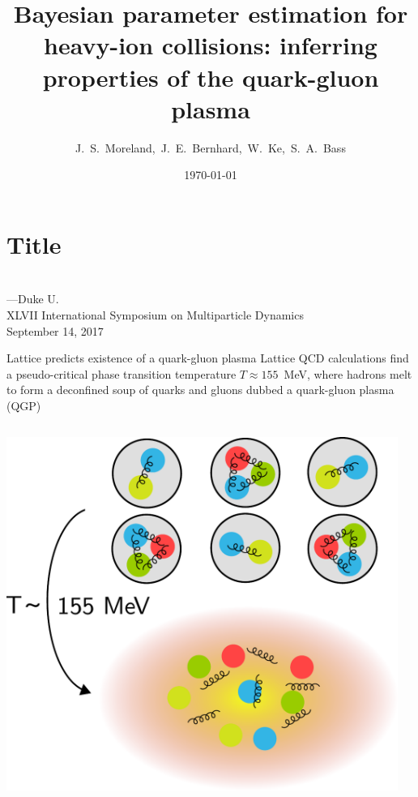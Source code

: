 \documentclass{beamer}
\title[Bayesian parameter estimation for HIC]{Bayesian parameter estimation for heavy-ion collisions: inferring properties of the quark-gluon plasma}
\author[J.\ S.\ Moreland]{J.\ S.\ Moreland,\, J.\ E.\ Bernhard,\, W.\ Ke,\, S.\ A.\ Bass}
\institute[Duke U.]{Duke Univerity}
\date{\today}
\begin{document}
\section{Title}


\begin{frame}
  \centering \vspace{.3\textheight}
  {\color{theme}\large\rm\inserttitle} \\[.04\textheight]
  {\small \insertauthor---Duke U.} \\[1ex]
  {\small XLVII International Symposium on Multiparticle Dynamics\\September 14, 2017}
\end{frame}


\begin{frame}{Lattice predicts existence of a quark-gluon plasma}
  Lattice QCD calculations find a pseudo-critical phase transition temperature $T \approx 155$~MeV, where hadrons melt to form a deconfined soup of quarks and gluons dubbed a quark-gluon plasma (QGP)\\[2ex]
  \begin{columns}
    \begin{column}{0.47\textwidth}
        \includegraphics[width=\columnwidth]{confined_deconfined}
    \end{column}
    \begin{column}{0.4\textwidth}

\end{column}
\end{columns}
\end{frame}
\end{document}
